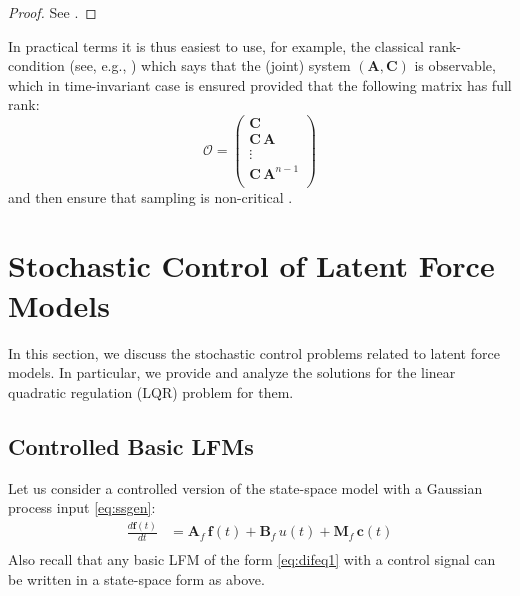 \documentclass[journal]{IEEEtran}
\newcommand{\simo}[1]{{\color{red}#1}}
\begin{document}
\begin{proof}
See \cite{Ding:2009}.
\end{proof}
%
In practical terms it is thus easiest to use, for example, the classical rank-condition (see, e.g., \cite{Ogata:1997}) which says that the (joint) system $(\mathbf{A},\mathbf{C})$ is observable, which in time-invariant case is ensured provided that the following matrix has full rank:
%
\begin{equation}
  \mathcal{O} = 
  \begin{pmatrix}
    \mathbf{C} \\
    \mathbf{C} \, \mathbf{A} \\
    \vdots \\
    \mathbf{C} \, \mathbf{A}^{n-1} \\    
  \end{pmatrix}
\end{equation}
%
and then ensure that sampling is non-critical \cite{Ding:2009}.

%

\section{Stochastic Control of Latent Force Models}
%
In this section, we discuss the stochastic control problems related to latent force models. In particular, we provide and analyze the solutions for the linear quadratic regulation (LQR) problem for them.

\subsection{Controlled Basic LFMs} \label{sec:controlled_basic}
%
Let us consider a controlled version of the state-space model with a Gaussian process input \eqref{eq:ssgen}:
\begin{equation}
\begin{split}
  \frac{d\mathbf{f}(t)}{dt}
  &= \mathbf{A}_f \, \mathbf{f}(t) + \mathbf{B}_f \, u(t) + \mathbf{M}_f \, \mathbf{c}(t) \\
\end{split}
\end{equation}
%
Also recall that any basic LFM of the form \eqref{eq:difeq1} with a control signal can be written in a state-space form as above.
\end{document}
